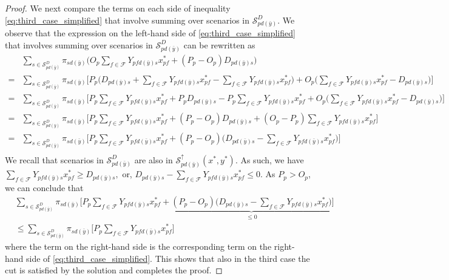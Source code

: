 \documentclass[12pt]{article}
\theoremstyle{thmstylethree}%
\begin{document}
\begin{proof}
We next compare the terms on each side of inequality \eqref{eq:third_case_simplified} that involve summing over scenarios in $\mathcal{S}^D_{pd(\bar{y})}$. We observe that the expression on the left-hand side of \eqref{eq:third_case_simplified} that involves summing over scenarios in $\mathcal{S}^D_{pd(\bar{y})}$ can be rewritten as
\begin{align*}
     &\sum_{s \in \mathcal{S}^D_{pd(\bar{y})}} \pi_{sd(\bar{y})}\bigg(O_p\sum_{f\in\mathcal{F}}Y_{pfd(\bar{y})s}x^*_{pf}+(P_p-O_p)D_{pd(\bar{y})s}\bigg)\\
     =&\sum_{s \in \mathcal{S}^D_{pd(\bar{y})}}\pi_{sd(\bar{y})}\bigg[P_p\bigg(D_{pd(\bar{y})s}+\sum_{f\in\mathcal{F}}Y_{pfd(\bar{y})s}x^*_{pf}-\sum_{f\in\mathcal{F}}Y_{pfd(\bar{y})s}x^*_{pf}\bigg)+O_p\bigg(\sum_{f\in\mathcal{F}}Y_{pfd(\bar{y})s}x^*_{pf}-D_{pd(\bar{y})s}\bigg)\bigg]\\
     =&\sum_{s \in \mathcal{S}^D_{pd(\bar{y})}}\pi_{sd(\bar{y})}\bigg[P_p\sum_{f\in\mathcal{F}}Y_{pfd(\bar{y})s}x^*_{pf}+P_pD_{pd(\bar{y})s}-P_p\sum_{f\in\mathcal{F}}Y_{pfd(\bar{y})s}x^*_{pf}+O_p\bigg(\sum_{f\in\mathcal{F}}Y_{pfd(\bar{y})s}x^*_{pf}-D_{pd(\bar{y})s}\bigg)\bigg]\\
     =&\sum_{s \in \mathcal{S}^D_{pd(\bar{y})}}\pi_{sd(\bar{y})}\bigg[P_p\sum_{f\in\mathcal{F}}Y_{pfd(\bar{y})s}x^*_{pf}+(P_p-O_p)D_{pd(\bar{y})s}+(O_p-P_p)\sum_{f\in\mathcal{F}}Y_{pfd(\bar{y})s}x^*_{pf}\bigg]\\
     =&\sum_{s \in \mathcal{S}^D_{pd(\bar{y})}}\pi_{sd(\bar{y})}\bigg[P_p\sum_{f\in\mathcal{F}}Y_{pfd(\bar{y})s}x^*_{pf}+(P_p-O_p)\bigg(D_{pd(\bar{y})s}-\sum_{f\in\mathcal{F}}Y_{pfd(\bar{y})s}x^*_{pf}\bigg)\bigg]\\
\end{align*}
We recall that scenarios in $\mathcal{S}^D_{pd(\bar{y})}$ are also in $\mathcal{S}^{\uparrow}_{pd(\bar{y})}(x^{*},y^{*})$.
As such, we have $\sum_{f \in \mathcal{F}}Y_{pfd(\bar{y})s}x_{pf}^* \geq D_{pd(\bar{y})s},$ or,  $D_{pd(\bar{y})s}- \sum_{f \in \mathcal{F}}Y_{pfd(\bar{y})s}x_{pf}^*\leq 0$. As $P_p>O_p$, we can conclude that 
\begin{align*}
&\sum_{s \in \mathcal{S}^D_{pd(\bar{y})}}\pi_{sd(\bar{y})}\bigg[P_p\sum_{f\in\mathcal{F}}Y_{pfd(\bar{y})s}x^*_{pf}+\underbrace{(P_p-O_p)\bigg(D_{pd(\bar{y})s}-\sum_{f\in\mathcal{F}}Y_{pfd(\bar{y})s}x^*_{pf}\bigg)}_{\leq 0}\bigg]\\
&\leq \sum_{s \in \mathcal{S}^D_{pd(\bar{y})}}\pi_{sd(\bar{y})}\bigg[P_p\sum_{f\in\mathcal{F}}Y_{pfd(\bar{y})s}x^*_{pf}\bigg]
\end{align*}    
where the term on the right-hand side is the corresponding term on the right-hand side of \eqref{eq:third_case_simplified}. This shows that also in the third case the cut is satisfied by the solution and completes the proof. 
\end{proof}
\end{document}
